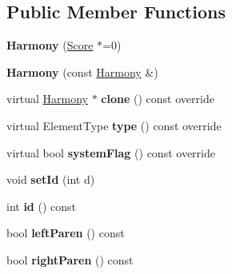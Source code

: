 \subsection*{Public Member Functions}
\begin{DoxyCompactItemize}
\item 
\mbox{\label{class_ms_1_1_harmony_aa2345c6f25ff6f141861c5f4250b0a07}} 
{\bfseries Harmony} (\hyperlink{class_ms_1_1_score}{Score} $\ast$=0)
\item 
\mbox{\label{class_ms_1_1_harmony_a8ca43ba663f1f7f725ff14356b4a5273}} 
{\bfseries Harmony} (const \hyperlink{class_ms_1_1_harmony}{Harmony} \&)
\item 
\mbox{\label{class_ms_1_1_harmony_a64198cdd9186ff86693230dbff166421}} 
virtual \hyperlink{class_ms_1_1_harmony}{Harmony} $\ast$ {\bfseries clone} () const override
\item 
\mbox{\label{class_ms_1_1_harmony_a9006d54c3216de3c0701c752b48f6e94}} 
virtual Element\+Type {\bfseries type} () const override
\item 
\mbox{\label{class_ms_1_1_harmony_a1f3c14201a0f9038addac9b98a20e698}} 
virtual bool {\bfseries system\+Flag} () const override
\item 
\mbox{\label{class_ms_1_1_harmony_a6c6f39144bf323afc5e97306bdee5ad9}} 
void {\bfseries set\+Id} (int d)
\item 
\mbox{\label{class_ms_1_1_harmony_a8c34cad119f33ae68f04e370f0cb38b4}} 
int {\bfseries id} () const
\item 
\mbox{\label{class_ms_1_1_harmony_ab1db515d36c406d2bb23950936427a36}} 
bool {\bfseries left\+Paren} () const
\item 
\mbox{\label{class_ms_1_1_harmony_a02a38fccd3c6bf3aa1c1440ededc9d8f}} 
bool {\bfseries right\+Paren} () const
\item 
\mbox{\label{class_ms_1_1_harmony_aeaee669ded862fe29091e306eb729530}} 

\end{DoxyCompactItemize}
